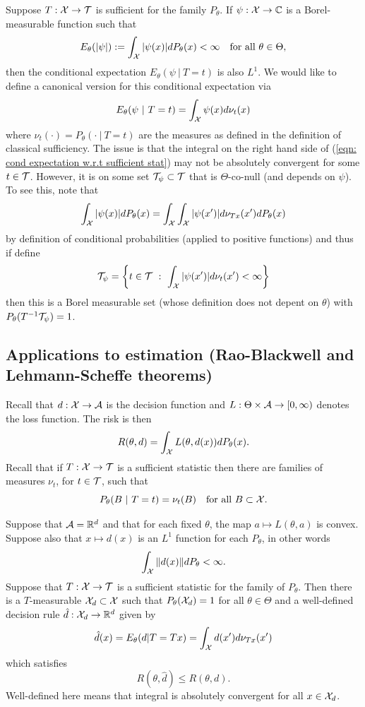 \documentclass[twoside, a4paper, 10pt]{amsart}
\begin{document}
Suppose $T:\mathcal{X} \to \mathcal{T}$ is sufficient for the family $P_{\theta}$. If $\psi:\mathcal{X} \to \mathbb{C}$ is a Borel-measurable function such that $$E_{\theta}(|\psi|) := \int_{\mathcal{X}} |\psi(x)| dP_{\theta}(x) < \infty \quad\text{for all } \theta \in \Theta,$$ then the conditional expectation $E_{\theta}(\psi ~|~ T=t)$ is also $L^1$. We would like to define a canonical version for this conditional expectation via 
\begin{align}\label{eqn: cond expectation w.r.t sufficient stat} E_{\theta}(\psi ~|~ T=t) = \int_{\mathcal{X}} \psi(x) d\nu_t(x) \end{align} where $\nu_t(\cdot) = P_{\theta}( \cdot ~|~ T=t)$ are the measures as defined in the definition of classical sufficiency. The issue is that the integral on the right hand side of (\ref{eqn: cond expectation w.r.t sufficient stat}) may not be absolutely convergent for some $t \in \mathcal{T}$. However, it is on some set $\mathcal{T}_{\psi} \subset \mathcal{T}$ that is $\Theta$-co-null (and depends on $\psi$). To see this, note that $$\int_{\mathcal{X}} |\psi(x)| dP_{\theta}(x) = \int_{\mathcal{X}} \int_{\mathcal{X}} |\psi(x')| d\nu_{Tx}(x') dP_{\theta}(x)$$ by definition of conditional probabilities (applied to positive functions) and thus if define $$\mathcal{T}_{\psi} = \left\{ t \in \mathcal{T} ~:~ \int_{\mathcal{X}} |\psi(x')| d\nu_{t}(x') < \infty \right\}$$ then this is a Borel measurable set (whose definition does not depent on $\theta$) with $P_{\theta}(T^{-1}\mathcal{T}_{\psi}) = 1$.

\subsection{Applications to estimation (Rao-Blackwell and Lehmann-Scheffe theorems)}

Recall that $d:\mathcal{X} \to \mathcal{A}$ is the decision function and $L:\Theta \times \mathcal{A} \to [0,\infty)$ denotes the loss function. The risk is then $$R(\theta, d) = \int_{\mathcal{X}} L(\theta, d(x)) dP_{\theta}(x).$$ Recall that if $T:\mathcal{X} \to \mathcal{T}$ is a sufficient statistic then there are families of measures $\nu_t$, for $t \in \mathcal{T}$, such that $$P_{\theta}(B~|~T=t) = \nu_t(B) \quad \text{for all } B \subset \mathcal{X}.$$

\begin{thm} Suppose that $\mathcal{A} = \mathbb{R}^d$ and that for each fixed $\theta$, the map $a \mapsto L(\theta, a)$ is convex. Suppose also that $x \mapsto d(x)$ is an $L^1$ function for each $P_{\theta}$, in other words $$\int_{\mathcal{X}} \|d(x) \| dP_{\theta} < \infty.$$ Suppose that $T:\mathcal{X} \to \mathcal{T}$ is a sufficient statistic for the family of $P_{\theta}$. Then there is a $T$-measurable $\mathcal{X}_d \subset \mathcal{X}$ such that $P_{\theta}(\mathcal{X}_d) = 1$ for all $\theta \in \Theta$ and a well-defined decision rule $\hat{d}:\mathcal{X}_d \to \mathbb{R}^d$ given by \begin{align}\label{eqn: Rao-Blackwell estimator} \hat{d}(x) = E_{\theta}(d |T=Tx) = \int_{\mathcal{X}} d(x') d\nu_{Tx}(x')\end{align} which satisfies $$R(\theta, \hat{d}) \leq R(\theta, d).$$ Well-defined here means that integral is absolutely convergent for all $x \in \mathcal{X}_d$.
 
\end{thm}
\end{document}
